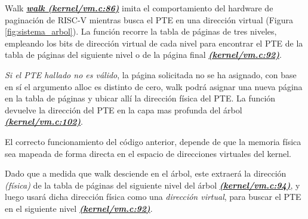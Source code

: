 \documentclass{libs/ufc_format}
\begin{document}
\begin{frame}{Walk}
  \href{https://github.com/CarlosSandoval-03/xv6-riscv/blob/riscv/kernel/vm.c\#L86}{\textbf{\textit{walk (kernel/vm.c:86)}}} imita el comportamiento del hardware de paginación de RISC-V mientras busca el PTE en una dirección virtual (Figura \ref{fig:sistema_arbol}). La función recorre la tabla de páginas de tres niveles, empleando los bits de dirección virtual de cada nivel para encontrar el PTE de la tabla de páginas del siguiente nivel o de la página final \href{https://github.com/CarlosSandoval-03/xv6-riscv/blob/riscv/kernel/vm.c\#L92}{\textbf{\textit{(kernel/vm.c:92)}}}.

  \vspace{0.2cm}

  \emph{Si el PTE hallado no es válido}, la página solicitada no se ha asignado, con base en sí el argumento alloc es distinto de cero, walk podrá asignar una nueva página en la tabla de páginas y ubicar allí la dirección física del PTE. La función devuelve la dirección del PTE en la capa mas profunda del árbol \href{https://github.com/CarlosSandoval-03/xv6-riscv/blob/riscv/kernel/vm.c\#L102}{\textbf{\textit{(kernel/vm.c:102)}}}. \cite{xv6_book} \cite{xv6}
\end{frame}
\begin{frame}{}
  El correcto funcionamiento del código anterior, depende de que la memoria física sea mapeada de forma directa en el espacio de direcciones virtuales del kernel.

  \vspace{0.2cm}

  Dado que a medida que walk desciende en el árbol, este extraerá la dirección \emph{(física)} de la tabla de páginas del siguiente nivel del árbol \href{https://github.com/CarlosSandoval-03/xv6-riscv/blob/riscv/kernel/vm.c\#L94}{\textbf{\textit{(kernel/vm.c:94)}}}, y luego usará dicha dirección física como una \emph{dirección virtual}, para buscar el PTE en el siguiente nivel \href{https://github.com/CarlosSandoval-03/xv6-riscv/blob/riscv/kernel/vm.c\#L92}{\textbf{\textit{(kernel/vm.c:92)}}}. \cite{xv6_book} \cite{xv6}
\end{frame}
\end{document}
